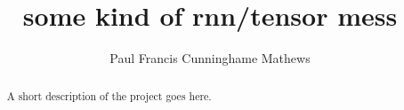 \documentclass[11pt
              , a4paper
              , twoside
              , openright
              ]{report}
\title{some kind of rnn/tensor mess}
\author{Paul Francis Cunninghame Mathews}
\date{}
\begin{document}
\frontmatter



\begin{abstract}

A short description of the project goes here.

\end{abstract}


\maketitle



\tableofcontents



\mainmatter











\backmatter



%
%
%
\printbibliography
\end{document}
